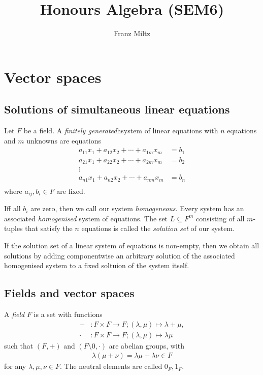 \documentclass{article}
\begin{document}
\mkthmstwounified
\title{Honours Algebra (SEM6)}
\author{Franz Miltz}
\maketitle
\tableofcontents
\pagebreak

\section{Vector spaces}

\subsection{Solutions of simultaneous linear equations}

\begin{definition}
	Let $F$ be a field. A \emph{finitely generated}h{system of linear equations} with $n$ equations and
	$m$ unknowns are equations
	\begin{align*}
		a_{11}x_1 + a_{12}x_2 + \cdots + a_{1m}x_m & = b_1 \\
		a_{21}x_1 + a_{22}x_2 + \cdots + a_{2m}x_m & = b_2 \\
		\vdots                                             \\
		a_{n1}x_1 + a_{n2}x_2 + \cdots + a_{nm}x_m & = b_n \\
	\end{align*}
	where $a_{ij},b_i\in F$ are fixed.

	Iff all $b_i$ are zero, then we call our system \emph{homogeneous}. Every system
	has an associated \emph{homogenised} system of equations.
	The set $L\subseteq F^m$ consisting of all $m$-tuples that satisfy the
	$n$ equations is called the \emph{solution set} of our system.
\end{definition}

\begin{theorem}[Theorem 1.1.4]
	If the solution set of a linear system of equations is non-empty, then we obtain
	all solutions by adding componentwise an arbitrary solution of the associated
	homogenised system to a fixed soltuion of the system itself.
\end{theorem}

\subsection{Fields and vector spaces}

\begin{definition}
	A \emph{field} $F$ is a set with functions
	\begin{align*}
		+     & : F\times F \to F ; (\lambda,\mu) \mapsto \lambda + \mu, \\
		\cdot & : F\times F \to F ; (\lambda,\mu) \mapsto \lambda \mu
	\end{align*}
	such that $(F,+)$ and $(F\setminus{0},\cdot)$ are abelian groups, with
	\begin{align*}
		\lambda(\mu + \nu) = \lambda \mu + \lambda \nu \in F
	\end{align*}
	for any $\lambda,\mu,\nu\in F$. The neutral elements are called $0_F,1_F$.
\end{definition}
\end{document}
